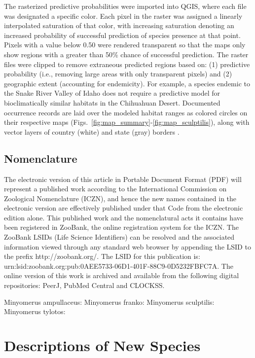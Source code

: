 \documentclass[fleqn,10pt,lineno]{wlpeerj} %
\begin{document}
		The rasterized predictive probabilities were imported into QGIS, where each file was designated a specific color. 
		Each pixel in the raster was assigned a linearly interpolated saturation of that color, with increasing saturation denoting an increased probability of successful prediction of species presence at that point.
		Pixels with a value below 0.50 were rendered transparent so that the maps only show regions with a greater than 50\% chance of successful prediction.
		The raster files were clipped to remove extraneous predicted regions based on: (1) predictive probability (i.e., removing large areas with only transparent pixels) and (2) geographic extent (accounting for endemicity).
		For example, a species endemic to the Snake River Valley of Idaho does not require a predictive model for bioclimatically similar habitats in the Chihuahuan Desert.
		Documented occurrence records are laid over the modeled habitat ranges as colored circles on their respective maps (Figs.~\ref{fig:map_summary}-\ref{fig:map_sculptilis}), along with vector layers of country (white) and state (gray) borders \citep{hijmans2012}.
		
	\subsection*{Nomenclature}
		The electronic version of this article in Portable Document Format (PDF) will represent a published work according to the International Commission on Zoological Nomenclature (ICZN), and hence the new names contained in the electronic version are effectively published under that Code from the electronic edition alone. 
		This published work and the nomenclatural acts it contains have been registered in ZooBank, the online registration system for the ICZN. 
		The ZooBank LSIDs (Life Science Identifiers) can be resolved and the associated information viewed through any standard web browser by appending the LSID to the prefix http://zoobank.org/. 
		The LSID for this publication is: urn:lsid:zoobank.org:pub:0AEE5733-06D1-401F-88C9-0D5232FBFC7A. The online version of this work is archived and available from the following digital repositories: PeerJ, PubMed Central and CLOCKSS.
		
Minyomerus ampullaceus: 
Minyomerus franko: 
Minyomerus sculptilis: 
Minyomerus tylotos: 
		
\section*{Descriptions of New Species}\label{sec:nsp} 
\end{document}
